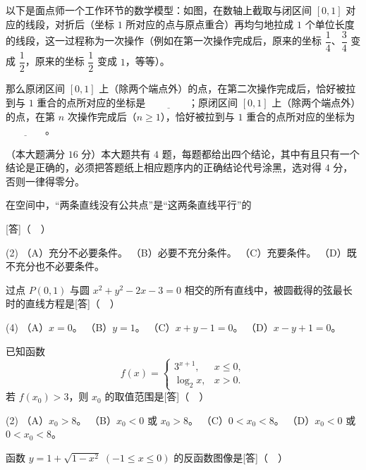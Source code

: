 \begin{question}
以下是面点师一个工作环节的数学模型：如图，在数轴上截取与闭区间 $[0,1]$ 对应的线段，对折后（坐标 $1$ 所对应的点与原点重合）再均匀地拉成 $1$ 个单位长度的线段，这一过程称为一次操作（例如在第一次操作完成后，原来的坐标 $\dfrac14$、$\dfrac34$ 变成 $\dfrac12$，原来的坐标 $\dfrac12$ 变成 $1$，等等）。

那么原闭区间 $[0,1]$ 上（除两个端点外）的点，在第二次操作完成后，恰好被拉到与 $1$ 重合的点所对应的坐标是 $\underline{\qquad\qquad}$；原闭区间 $[0,1]$ 上（除两个端点外）的点，在第 $n$ 次操作完成后（$n\ge 1$），恰好被拉到与 $1$ 重合的点所对应的坐标为 $\underline{\qquad\qquad}$。
\nopagebreak[4]
\begin{center}\end{center}
\nopagebreak[4]
\end{question}

（本大题满分 $16$ 分）本大题共有 $4$ 题，每题都给出四个结论，其中有且只有一个结论是正确的，必须把答题纸上相应题序内的正确结论代号涂黑，选对得 $4$ 分，否则一律得零分。

\begin{question}
在空间中，“两条直线没有公共点”是“这两条直线平行”的

[答]（　）

\begin{gkopts}(2)
\task （A）充分不必要条件。
\task （B）必要不充分条件。
\task （C）充要条件。
\task （D）既不充分也不必要条件。
\end{gkopts}

\end{question}
\begin{question}
过点 $P(0,1)$ 与圆 $x^2+y^2-2x-3=0$ 相交的所有直线中，被圆截得的弦最长时的直线方程是[答]（　）

\begin{gkopts}(4)
\task （A）$x=0$。
\task （B）$y=1$。
\task （C）$x+y-1=0$。
\task （D）$x-y+1=0$。
\end{gkopts}

\end{question}
\begin{question}
已知函数
\nopagebreak[4]
\[
f(x)=\begin{cases}
3^{x+1},&x\le 0,\\
\log_2 x,&x>0.
\end{cases}
\]
若 $f(x_0)>3$，则 $x_0$ 的取值范围是[答]（　）

\begin{gkopts}(2)
\task （A）$x_0>8$。
\task （B）$x_0<0$ 或 $x_0>8$。
\task （C）$0<x_0<8$。
\task （D）$x_0<0$ 或 $0<x_0<8$。
\end{gkopts}

\Needspace{0.4\textheight}
\end{question}
\begin{question}
函数 $y=1+\sqrt{1-x^2}\;(-1\le x\le 0)$ 的反函数图像是[答]（　）
\nopagebreak[4]
\begin{center}\end{center}
\nopagebreak[4]
\end{question}

